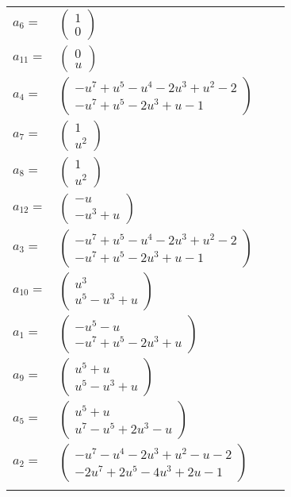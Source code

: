 \documentclass[1p]{elsarticle_modified}
\theoremstyle{definition}
\begin{document}
\begin{tabular}{m{7pt} m{180pt} m{7pt} m{180pt} }
\flushright $a_{6}=$&$\begin{pmatrix}1\\0\end{pmatrix}$ \\
\flushright $a_{11}=$&$\begin{pmatrix}0\\u\end{pmatrix}$ \\
\flushright $a_{4}=$&$\begin{pmatrix}- u^7+u^5- u^4-2 u^3+u^2-2\\- u^7+u^5-2 u^3+u-1\end{pmatrix}$ \\
\flushright $a_{7}=$&$\begin{pmatrix}1\\u^2\end{pmatrix}$ \\
\flushright $a_{8}=$&$\begin{pmatrix}1\\u^2\end{pmatrix}$ \\
\flushright $a_{12}=$&$\begin{pmatrix}- u\\- u^3+u\end{pmatrix}$ \\
\flushright $a_{3}=$&$\begin{pmatrix}- u^7+u^5- u^4-2 u^3+u^2-2\\- u^7+u^5-2 u^3+u-1\end{pmatrix}$ \\
\flushright $a_{10}=$&$\begin{pmatrix}u^3\\u^5- u^3+u\end{pmatrix}$ \\
\flushright $a_{1}=$&$\begin{pmatrix}- u^5- u\\- u^7+u^5-2 u^3+u\end{pmatrix}$ \\
\flushright $a_{9}=$&$\begin{pmatrix}u^5+u\\u^5- u^3+u\end{pmatrix}$ \\
\flushright $a_{5}=$&$\begin{pmatrix}u^5+u\\u^7- u^5+2 u^3- u\end{pmatrix}$ \\
\flushright $a_{2}=$&$\begin{pmatrix}- u^7- u^4-2 u^3+u^2- u-2\\-2 u^7+2 u^5-4 u^3+2 u-1\end{pmatrix}$\\&\end{tabular}
\end{document}
